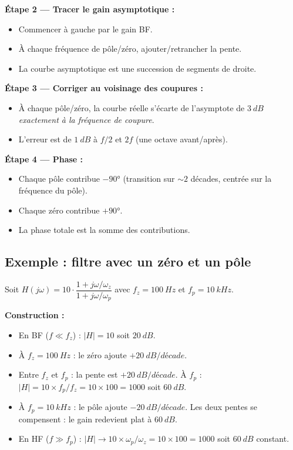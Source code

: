 \documentclass[12pt,a4paper,twoside]{book}
\begin{document}
\textbf{Étape 2 --- Tracer le gain asymptotique :}
\begin{itemize}[nosep]
\item Commencer à gauche par le gain BF.
\item À chaque fréquence de pôle/zéro, ajouter/retrancher la pente.
\item La courbe asymptotique est une succession de segments de droite.
\end{itemize}

\textbf{Étape 3 --- Corriger au voisinage des coupures :}
\begin{itemize}[nosep]
\item À chaque pôle/zéro, la courbe réelle s'écarte de l'asymptote de $\SI{3}{dB}$ \textit{exactement à la fréquence de coupure}.
\item L'erreur est de $\SI{1}{dB}$ à $f/2$ et $2f$ (une octave avant/après).
\end{itemize}

\textbf{Étape 4 --- Phase :}
\begin{itemize}[nosep]
\item Chaque pôle contribue $-90°$ (transition sur $\sim 2$ décades, centrée sur la fréquence du pôle).
\item Chaque zéro contribue $+90°$.
\item La phase totale est la somme des contributions.
\end{itemize}

\subsection{Exemple : filtre avec un zéro et un pôle}

Soit $H(j\omega) = 10 \cdot \dfrac{1 + j\omega/\omega_{z}}{1 + j\omega/\omega_{p}}$ avec $f_z = \SI{100}{Hz}$ et $f_p = \SI{10}{kHz}$.

\textbf{Construction :}
\begin{itemize}[nosep]
\item En BF ($f \ll f_z$) : $|H| = 10$ soit $\SI{+20}{dB}$.
\item À $f_z = \SI{100}{Hz}$ : le zéro ajoute $+\SI{20}{dB/décade}$.
\item Entre $f_z$ et $f_p$ : la pente est $+\SI{20}{dB/décade}$. À $f_p$ : $|H| = 10 \times f_p/f_z = 10 \times 100 = 1000$ soit $\SI{+60}{dB}$.
\item À $f_p = \SI{10}{kHz}$ : le pôle ajoute $-\SI{20}{dB/décade}$. Les deux pentes se compensent : le gain redevient plat à $\SI{+60}{dB}$.
\item En HF ($f \gg f_p$) : $|H| \to 10 \times \omega_p/\omega_z = 10 \times 100 = 1000$ soit $\SI{+60}{dB}$ constant.
\end{itemize}
\end{document}
